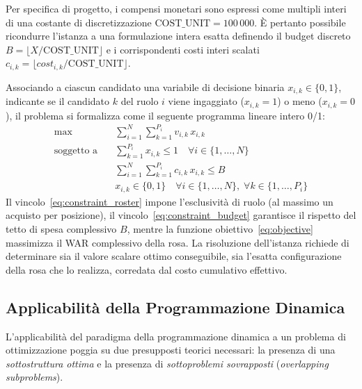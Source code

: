 Per specifica di progetto, i compensi monetari sono espressi come multipli interi di una costante di discretizzazione $\text{COST\_UNIT} = 100\,000$. È pertanto possibile ricondurre l'istanza a una formulazione intera esatta definendo il budget discreto $B = \lfloor X / \text{COST\_UNIT} \rfloor$ e i corrispondenti costi interi scalati $c_{i,k} = \lfloor \mathit{cost}_{i,k} / \text{COST\_UNIT} \rfloor$.

Associando a ciascun candidato una variabile di decisione binaria $x_{i,k} \in \{0, 1\}$, indicante se il candidato $k$ del ruolo $i$ viene ingaggiato ($x_{i,k} = 1$) o meno ($x_{i,k} = 0$), il problema si formalizza come il seguente programma lineare intero 0/1:
\begin{align}
	\max \quad              & \sum_{i=1}^N \sum_{k=1}^{P_i} v_{i,k} \, x_{i,k} \label{eq:objective}                                                     \\
	\text{soggetto a} \quad & \sum_{k=1}^{P_i} x_{i,k} \le 1 \quad \forall i \in \{1, \dots, N\} \label{eq:constraint_roster}                           \\
	                        & \sum_{i=1}^N \sum_{k=1}^{P_i} c_{i,k} \, x_{i,k} \le B \label{eq:constraint_budget}                                       \\
	                        & x_{i,k} \in \{0, 1\} \quad \forall i \in \{1, \dots, N\}, \; \forall k \in \{1, \dots, P_i\} \label{eq:constraint_binary}
\end{align}
Il vincolo~\eqref{eq:constraint_roster} impone l'esclusività di ruolo (al massimo un acquisto per posizione), il vincolo~\eqref{eq:constraint_budget} garantisce il rispetto del tetto di spesa complessivo $B$, mentre la funzione obiettivo~\eqref{eq:objective} massimizza il WAR complessivo della rosa. La risoluzione dell'istanza richiede di determinare sia il valore scalare ottimo conseguibile, sia l'esatta configurazione della rosa che lo realizza, corredata dal costo cumulativo effettivo.

\subsection{Applicabilità della Programmazione Dinamica}
L'applicabilità del paradigma della programmazione dinamica a un problema di ottimizzazione poggia su due presupposti teorici necessari: la presenza di una \textit{sottostruttura ottima} e la presenza di \textit{sottoproblemi sovrapposti} (\textit{overlapping subproblems}).

